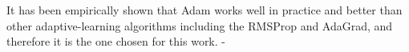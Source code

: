 
It has been empirically shown that Adam works well in practice and better than other adaptive-learning algorithms including the RMSProp and AdaGrad, and therefore it is the one chosen for this work.
-
